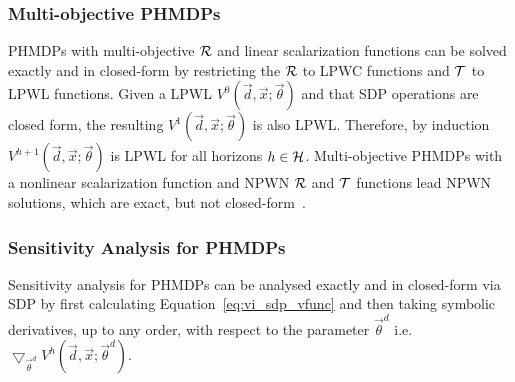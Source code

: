 
\subsubsection{Multi-objective PHMDPs}

PHMDPs with multi-objective {\footnotesize $\mathcal{R}$} and linear scalarization functions can be solved exactly and in closed-form by restricting the {\footnotesize $\mathcal{R}$} to LPWC functions and {\footnotesize $\mathcal{T}$} to LPWL functions. Given a LPWL {\footnotesize $V^{0}(\vec{d}, \vec{x}; \vec{\theta})$} and that SDP operations are closed form, the resulting {\footnotesize $V^{1}(\vec{d}, \vec{x}; \vec{\theta})$} is also LPWL. Therefore, by induction {\footnotesize $V^{h+1}(\vec{d}, \vec{x}; \vec{\theta})$} is LPWL for all horizons {\footnotesize $ h \in \mathcal{H} $}. Multi-objective PHMDPs with a nonlinear scalarization function and NPWN {\footnotesize $\mathcal{R}$} and {\footnotesize $\mathcal{T}$} functions lead NPWN solutions, which are exact, but not closed-form~\parencite{Sanner_UAI_2011}.

\subsubsection{Sensitivity Analysis for PHMDPs}


Sensitivity analysis for PHMDPs can be analysed exactly and in closed-form via SDP by first calculating Equation~\eqref{eq:vi_sdp_vfunc} and then taking symbolic derivatives, up to any order, with respect to the parameter {\footnotesize $\vec{\theta}^{d}$} i.e. {\footnotesize $\bigtriangledown_{\vec{\theta}^{d}} V^{h}\left(\vec{d}, \vec{x}; \vec{\theta}^{d}\right)$}.

